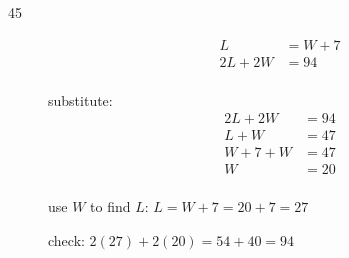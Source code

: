 \documentclass[fleqn,addpoints]{exam}
\begin{document}
\begin{description}
\item[45]
\begin{align*}
  L &= W + 7 \\
  2L + 2W &= 94 \\
\end{align*}

substitute:
\begin{align*}
  2L + 2W &= 94 \\
  L + W &= 47 \\
  W+7 + W &= 47 \\
  W &= 20 \\
\end{align*}

use $W$ to find $L$: $  L = W + 7 = 20 + 7 = 27$

check: $2(27) + 2(20) = 54 + 40 = 94$
\begin{align*}
\end{align*}


\end{description}
\end{document}
